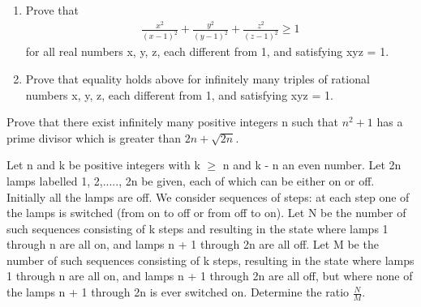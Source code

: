 \item 
\begin{enumerate}
\item Prove that
\begin{align*}
\frac{x^{2}}{(x - 1)^{2}}+\frac{y^{2}}{(y - 1)^{2}} + \frac{z^{2}}{(z - 1)^{2}}\geq1
\end{align*}
for all real numbers x, y, z, each different from 1, and satisfying xyz = 1.
\item Prove that equality holds above for infinitely many triples of rational numbers x, y, z, each different from 1, and satisfying xyz = 1.
\end{enumerate} 

\item Prove that there exist infinitely many positive integers n such that $n^{2} + 1$ has a prime divisor which is greater than $2n + \sqrt{2n}$.

\item Let n and k be positive integers with k $\geq$ n and k - n an even number. Let 2n lamps labelled 1, 2,....., 2n be given, each of which can be either on or off. Initially all the lamps are off. We consider sequences of steps: at each step one of the lamps is switched (from on to off or from off to on).
Let N be the number of such sequences consisting of k steps and resulting in the state where lamps 1 through n are all on, and lamps n + 1 through 2n are all off.
Let M be the number of such sequences consisting of k steps, resulting in the state where lamps 1 through n are all on, and lamps n + 1 through 2n are all off, but where none of the lamps n + 1 through 2n is ever switched on.
Determine the ratio $\frac{N}{M}$.
